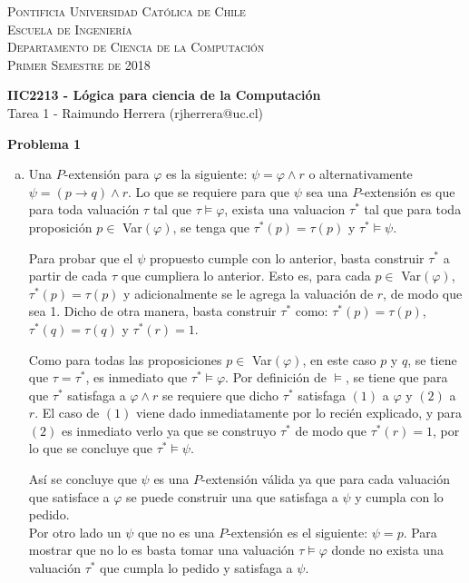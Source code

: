 \documentclass[letterpaper,10pt]{article}
\begin{document}
\small
\textsc{Pontificia Universidad Católica de Chile}\\
\textsc{Escuela de Ingeniería}\\
\textsc{Departamento de Ciencia de la Computación}\\
\textsc{Primer Semestre de 2018}

\large
\begin{center}
\textbf{IIC2213 - Lógica para ciencia de la Computación}\\
Tarea 1 - Raimundo Herrera (rjherrera@uc.cl)
\end{center}

\normalsize
\textbf{Problema 1}

\begin{enumerate}[a)]

    \item Una $P$-extensión para $\varphi$ es la siguiente: $\psi = \varphi \wedge r$ o alternativamente $\psi = (p \rightarrow q) \wedge r$.
    Lo que se requiere para que $\psi$ sea una $P$-extensión es que para toda valuación $\tau$ tal que  $\tau \models \varphi$, exista una valuacion $\tau^*$ tal que para toda proposición $p \in$ Var$(\varphi)$, se tenga que $\tau^*(p) = \tau(p)$ y $\tau^* \models \psi$.

    Para probar que el $\psi$ propuesto cumple con lo anterior, basta construir $\tau^*$ a partir de cada $\tau$ que cumpliera lo anterior. Esto es, para cada $p \in$ Var$(\varphi)$, $\tau^*(p) = \tau(p)$ y adicionalmente se le agrega la valuación de $r$, de modo que sea 1. Dicho de otra manera, basta construir $\tau^*$ como: $\tau^*(p) = \tau(p)$, $\tau^*(q) = \tau(q)$ y $\tau^*(r) = 1$.

    Como para todas las proposiciones $p \in$ Var$(\varphi)$, en este caso $p$ y $q$, se tiene que $\tau = \tau^*$, es inmediato que $\tau^* \models \varphi$. Por definición de $\models$, se tiene que para que $\tau^*$ satisfaga a $\varphi \wedge r$ se requiere que dicho $\tau^*$ satisfaga $(1)$ a $\varphi$ y $(2)$ a $r$. El caso de $(1)$ viene dado inmediatamente por lo recién explicado, y para $(2)$ es inmediato verlo ya que se construyo $\tau^*$ de modo que $\tau^*(r) = 1$, por lo que se concluye que $\tau^* \models \psi$.

    Así se concluye que $\psi$ es una $P$-extensión válida ya que para cada valuación que satisface a $\varphi$ se puede construir una que satisfaga a $\psi$ y cumpla con lo pedido.\\

    Por otro lado un $\psi$ que no es una $P$-extensión es el siguiente: $\psi = p$. Para mostrar que no lo es basta tomar una valuación $\tau \models \varphi$ donde no exista una valuación $\tau^*$ que cumpla lo pedido y satisfaga a $\psi$.


\end{enumerate}
\end{document}
